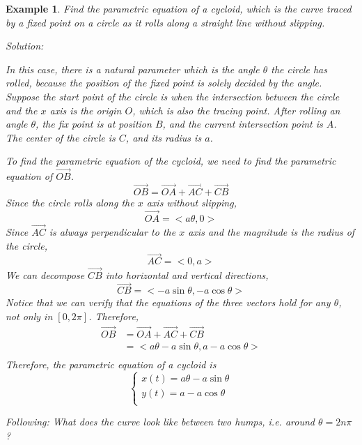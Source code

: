 \documentclass{article}
\newtheorem{example}{Example}
\begin{document}
\begin{example}
  Find the parametric equation of a cycloid, which is the curve traced by a 
  fixed point on a circle as it rolls along a straight line without slipping.

  Solution:

  In this case, there is a natural parameter which is the angle $\theta$ the 
  circle has rolled, because the position of the fixed point is solely decided 
  by the angle. Suppose the start point of the circle is when the intersection 
  between the circle and the $x$ axis is the origin $O$, which is also the 
  tracing point. After rolling an angle $\theta$, the fix point is at position 
  $B$, and the current intersection point is $A$. The center of the circle is 
  $C$, and its radius is $a$.

  To find the parametric equation of the cycloid, we need to find the 
  parametric equation of $\vec{OB}$.
  \[
    \vec{OB} = \vec{OA} + \vec{AC} + \vec{CB}
  \]
  Since the circle rolls along the $x$ axis without slipping,
  \[
    \vec{OA} = <a\theta, 0>
  \]
  Since $\vec{AC}$ is always perpendicular to the $x$ axis and the magnitude 
  is the radius of the circle,
  \[
    \vec{AC} = <0, a>
  \]
  We can decompose $\vec{CB}$ into horizontal and vertical directions,
  \[
    \vec{CB} = <-a\sin\theta, -a\cos\theta>
  \]
  Notice that we can verify that the equations of the three vectors hold for 
  any $\theta$, not only in $[0, 2\pi]$. Therefore,
  \[
    \begin{split}
    \vec{OB} &= \vec{OA} + \vec{AC} + \vec{CB} \\
             &= <a\theta - a\sin\theta, a - a\cos\theta> \\
    \end{split}
  \]
  Therefore, the parametric equation of a cycloid is
  \[
    \left\{ \begin{array}{ll}
    x(t) = a\theta - a\sin\theta \\
    y(t) = a - a\cos\theta \\
    \end{array} \right.
  \]

  \bigskip

  Following: What does the curve look like between two humps, i.e. around 
  $\theta = 2n\pi$?


\end{example}
\end{document}
